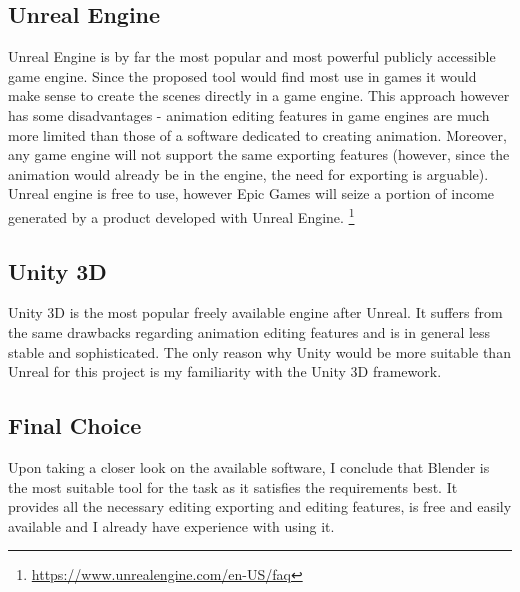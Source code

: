 \subsection{Unreal Engine}

Unreal Engine is by far the most popular and most powerful publicly accessible game engine. Since the proposed tool would find most use in games it would make sense to create the scenes directly in a game engine. This approach however has some disadvantages - animation editing features in game engines are much more limited than those of a software dedicated to creating animation. Moreover, any game engine will not support the same exporting features (however, since the animation would already be in the engine, the need for exporting is arguable). Unreal engine is free to use, however Epic Games will seize a portion of income generated by a product developed with Unreal Engine. \footnote{\url{https://www.unrealengine.com/en-US/faq}}

\subsection{Unity 3D}

Unity 3D is the most popular freely available engine after Unreal. It suffers from the same drawbacks regarding animation editing features and is in general less stable and sophisticated. The only reason why Unity would be more suitable than Unreal for this project is my familiarity with the Unity 3D framework.


\subsection{Final Choice}

Upon taking a closer look on the available software, I conclude that Blender is the most suitable tool for the task as it satisfies the requirements best. It provides all the necessary editing exporting and editing features, is free and easily available and I already have experience with using it.






